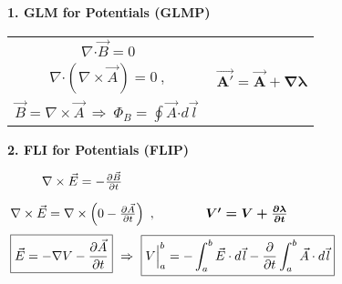 \documentclass[12pt]{article}
\newcommand{\hs}{\hspace{1pt}} %
\newcommand{\dotP}{\boldsymbol \cdot}		%
\begin{document}
\vspace{10pt}
\begin{minipage}[t]{0.48\textwidth}
	\textbf{1. GLM for Potentials (GLMP)}
	\begin{center}
	\begin{tabular}{c c}
		\( \nabla \dotP \vec{B} = 0 \) & \\[10pt]
		\( \nabla \dotP ( \nabla \times \vec{A} ) = 0 \ , \) & \( \boldsymbol{ \vec{A'} = \vec{A} + \nabla \lambda } \)\\[10pt]
		\( \boxed{ \vec{B} = \nabla \times \vec{A} }
			\ \Rightarrow \ \boxed{ \Phi_B = \oint \vec{A} \dotP d\vec{\hs l} \ } \) & 
	\end{tabular}
	\end{center}
\end{minipage} 
\hspace{0\textwidth}
\begin{minipage}[t]{0.48\textwidth}
	\textbf{2. FLI for Potentials (FLIP)}

	\vspace{10pt}
	\hfill
	\(\arraycolsep=2pt \begin{array}{c c}
		\nabla \times \vec{E} = - \frac{\partial \vec{B}}{\partial t} & 	
			\\[10pt]
		\nabla \times \vec{E} = \nabla \times \left ( 0 - \frac{\partial \vec{A}}{\partial t} \right ) \ , & 
			\boldsymbol{ V' = V + \frac{\partial \lambda}{\partial t} }
			\\[10pt]
		\multicolumn{2}{c}{
			\boxed{ \vec{E} = - \nabla V - \frac{\partial \vec{A}}{\partial t} }
			\ \Rightarrow\ 
			\boxed{
				V \Big|^b_a = - \int^b_a \vec{E} \cdot d\vec{\hs l} 
				- \frac{\partial}{\partial t} \int^b_a \vec{A} \cdot d\vec{\hs l}
			}
			}
	\end{array}\)
	\hfill\hs
\end{minipage} 
\end{document}
